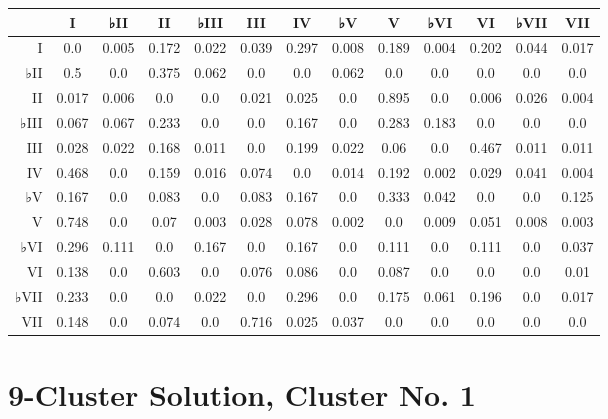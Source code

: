 \begin{table}[htbp]
\begin{minipage}{\linewidth}
\setlength{\tymax}{0.5\linewidth}
\centering
\small
\begin{tabulary}{\textwidth}{@{}RCCCCCCCCCCCC@{}} \toprule
&I&♭II&II&♭III&III&IV&♭V&V&♭VI&VI&♭VII&VII\\
\midrule
I&0.0&0.005&0.172&0.022&0.039&0.297&0.008&0.189&0.004&0.202&0.044&0.017\\
♭II&0.5&0.0&0.375&0.062&0.0&0.0&0.062&0.0&0.0&0.0&0.0&0.0\\
II&0.017&0.006&0.0&0.0&0.021&0.025&0.0&0.895&0.0&0.006&0.026&0.004\\
♭III&0.067&0.067&0.233&0.0&0.0&0.167&0.0&0.283&0.183&0.0&0.0&0.0\\
III&0.028&0.022&0.168&0.011&0.0&0.199&0.022&0.06&0.0&0.467&0.011&0.011\\
IV&0.468&0.0&0.159&0.016&0.074&0.0&0.014&0.192&0.002&0.029&0.041&0.004\\
♭V&0.167&0.0&0.083&0.0&0.083&0.167&0.0&0.333&0.042&0.0&0.0&0.125\\
V&0.748&0.0&0.07&0.003&0.028&0.078&0.002&0.0&0.009&0.051&0.008&0.003\\
♭VI&0.296&0.111&0.0&0.167&0.0&0.167&0.0&0.111&0.0&0.111&0.0&0.037\\
VI&0.138&0.0&0.603&0.0&0.076&0.086&0.0&0.087&0.0&0.0&0.0&0.01\\
♭VII&0.233&0.0&0.0&0.022&0.0&0.296&0.0&0.175&0.061&0.196&0.0&0.017\\
VII&0.148&0.0&0.074&0.0&0.716&0.025&0.037&0.0&0.0&0.0&0.0&0.0\\

\bottomrule

\end{tabulary}
\end{minipage}
\end{table}

\section{9-Cluster Solution, Cluster No. 1}
\label{9-clustersolutionclusterno.1}

